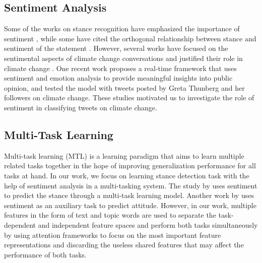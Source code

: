 \documentclass[letterpaper]{article}
\begin{document}
\subsection{Sentiment Analysis}\label{rw_sent}
Some of the works on stance recognition have emphasized the importance of sentiment \cite{wang2020neural}, while some have cited the orthogonal relationship between stance and sentiment of the statement \cite{sen2020reliability}. However, several works have focused on the sentimental aspects of climate change conversations and justified their role in climate change \cite{cody2015climate,jiang2017comparing}. One recent work \cite{el2021novel} proposes a real-time framework that uses sentiment and emotion analysis to provide meaningful insights into public opinion, and tested the model with tweets posted by Greta Thunberg and her followers on climate change. These studies motivated us to investigate the role of sentiment in classifying tweets on climate change.

\subsection{Multi-Task Learning}
\par \noindent Multi-task learning (MTL) \cite{caruana1997multitask} is a learning paradigm that aims to learn multiple related tasks together in the hope of improving generalization performance for all tasks at hand. %
In our work, we focus on learning stance detection task with the help of sentiment analysis in a multi-tasking system. The study by \cite{ li2019multi} uses sentiment to predict the stance through a multi-task learning model. Another work by \cite{chauhan2019attention} uses sentiment as an auxiliary task to predict attitude. However, in our work, multiple features in the form of text and topic words are used to separate the task-dependent and independent feature spaces and perform both tasks simultaneously by using attention frameworks to focus on the most important feature representations and discarding the useless shared features that may affect the performance of both tasks.
\end{document}
